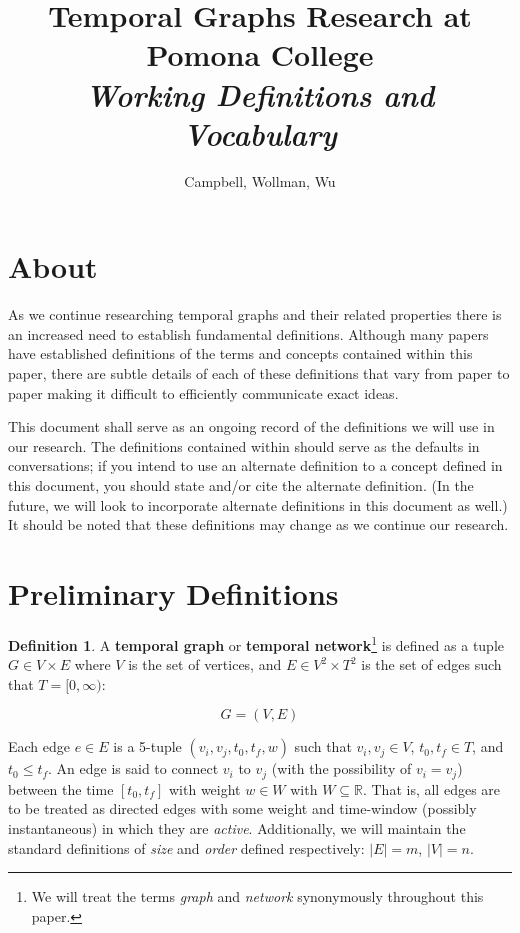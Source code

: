 \documentclass{article}
\title{Temporal Graphs Research at Pomona College\\
  \textit{Working Definitions and Vocabulary}
}
\author{Campbell, Wollman, Wu}
\theoremstyle{definition}
\newtheorem{defn}[thm]{Definition}
\numberwithin{thm}{subsection}
\begin{document}
\maketitle

\section{About}

As we continue researching temporal graphs and their related properties there is
an increased need to establish fundamental definitions. Although many papers
have established definitions of the terms and concepts contained within this
paper, there are subtle details of each of these definitions that vary from
paper to paper making it difficult to efficiently communicate exact ideas.

This document shall serve as an ongoing record of the definitions we will use
in our research. The definitions contained within should serve as the defaults
in conversations; if you intend to use an alternate definition to a concept
defined in this document, you should state and/or cite the alternate definition.
(In the future, we will look to incorporate alternate definitions in this
document as well.) It should be noted that these definitions may change as we
continue our research.

\section{Preliminary Definitions}

\begin{defn}
  A \textbf{temporal graph} or \textbf{temporal network}\footnote{We will treat
  the terms \textit{graph} and \textit{network} synonymously throughout this
  paper.} is defined as a tuple $G \in V \times E$ where $V$ is the set of
  vertices, and $E \in V^2 \times T^2$ is the set of edges such that
  $T = [0, \infty)$:

  \[ G = (V, E) \]

  Each edge $e \in E$ is a 5-tuple $(v_i, v_j, t_0, t_f, w)$ such that
  $v_i, v_j \in V$, $t_0, t_f \in T$, and $t_0 \leq t_f$. An edge is said to
  connect $v_i$ to $v_j$ (with the possibility of $v_i = v_j$) between the time
  $[t_0, t_f]$ with weight $w \in W$ with $W \subseteq \mathbb{R}$. That is, all
  edges are to be treated as directed edges with some weight and time-window
  (possibly instantaneous) in which they are \textit{active}. Additionally, we
  will maintain the standard definitions of \textit{size} and \textit{order}
  defined respectively: $|E| = m$,  $|V| = n$.
\end{defn}
\end{document}
